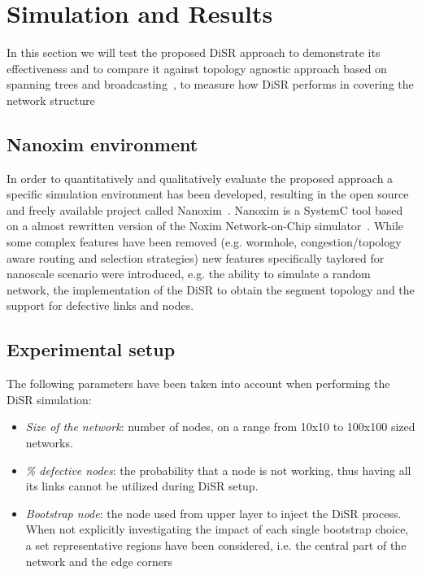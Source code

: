 
\section{Simulation and Results}
\label{sec:simulation}

In this section we will test the proposed DiSR approach to demonstrate
its effectiveness and to compare it against topology agnostic approach
based on spanning trees and
broadcasting~\cite{Patwardhan05evaluatingthe}, to measure how DiSR
performs in covering the network structure


\subsection{Nanoxim environment}

In order to quantitatively and qualitatively evaluate the proposed approach a
specific simulation environment has been developed, resulting in
the open source and freely available project called
Nanoxim~\cite{nanoxim}.
Nanoxim is a SystemC tool based on a almost rewritten
version of the Noxim Network-on-Chip simulator~\cite{noxim}. While some
complex features have been removed (e.g. wormhole, congestion/topology
aware routing and selection strategies) new features specifically
taylored for nanoscale scenario were introduced, e.g. the ability to simulate a random
network, the implementation of the DiSR to obtain the segment topology
and the support for defective links and nodes.

\subsection{Experimental setup}
The following parameters have been taken into account when
performing the DiSR simulation:
\begin{itemize}
\item {\emph{Size of the network}}: number of nodes, on a
range from 10x10 to 100x100 sized networks. 
\item {\emph{\% defective nodes}}: the probability that a node is not
working, thus having all its links cannot be utilized during DiSR setup.  
\item {\emph{Bootstrap node}}: the node used from upper layer 
to inject the DiSR process. When not explicitly investigating the
impact of each single bootstrap choice, a set representative regions have been
considered, i.e. the central part of the network and the edge corners
\end{itemize}

